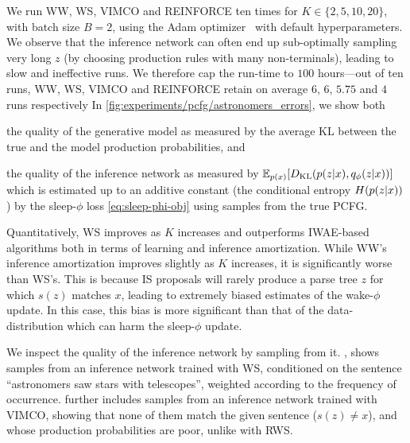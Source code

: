 We run \gls{WW}, \gls{WS}, \gls{VIMCO} and \acrshort{REINFORCE} ten times for $K \in \{2, 5, 10, 20\}$, with batch size \(B=2\), using the Adam optimizer~\citep{Kingma2015adam} with default hyperparameters.
%
We observe that the inference network can often end up sub-optimally sampling very long $z$ (by choosing production rules with many non-terminals), leading to slow and ineffective runs.
%
We therefore cap the run-time to $100$ hours---out of ten runs, \gls{WW}, \gls{WS}, \gls{VIMCO} and \acrshort{REINFORCE} retain on average $6$, $6$, $5.75$ and $4$ runs respectively
%
In \cref{fig:experiments/pcfg/astronomers_errors}, we show both
%
\begin{inparaenum}[(i)]
\item the quality of the generative model as measured by the average \gls{KL} between the true and the model production probabilities, and
\item the quality of the inference network as measured by $\mathbb{E}_{p(x)}[D_{\mathrm{KL}}(p(z \lvert x), q_\phi(z \lvert x))]$ which is estimated up to an additive constant (the conditional entropy $H(p(z \lvert x))$) by the sleep-$\phi$ loss \cref{eq:sleep-phi-obj} using samples from the true \gls{PCFG}.
\end{inparaenum}

Quantitatively, \gls{WS} improves as $K$ increases and outperforms \gls{IWAE}-based algorithms both in terms of learning and inference amortization.
While \gls{WW}'s inference amortization improves slightly as $K$ increases, it is significantly worse than \gls{WS}'s.
This is because \gls{IS} proposals will rarely produce a parse tree $z$ for which $s(z)$ matches $x$, leading to extremely biased estimates of the wake-$\phi$ update.
In this case, this bias is more significant than that of the data-distribution which can harm the sleep-$\phi$ update.

%
We inspect the quality of the inference network by sampling from it.
%
, shows samples from an inference network trained with \gls{WS}, conditioned on the sentence ``astronomers saw stars with telescopes'', weighted according to the frequency of occurrence.
%
 further includes samples from an inference network trained with \gls{VIMCO}, showing that none of them match the given sentence ($s(z) \neq x$), and whose production probabilities are poor, unlike with \gls{RWS}.

